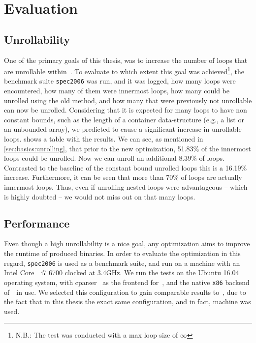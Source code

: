 \chapter{Evaluation}\label{sec:eval}

\section{Unrollability}\label{sec:eval:unrollability}

One of the primary goals of this thesis, was to increase the number of loops that are unrollable within~\libFIRM.
To evaluate to which extent this goal was achieved\footnote{N.B.: The test was conducted with a max loop size of $\infty$}, the benchmark suite \texttt{spec2006} was run, and it was logged, how many loops were encountered, how many of them were innermost loops, how many could be unrolled using the old method, and how many that were previously not unrollable can now be unrolled.
Considering that it is expected for many loops to have non constant bounds, such as the length of a container data-structure (e.g., a list or an unbounded array), we predicted to cause a significant increase in unrollable loops.
 shows a table with the results.
We can see, as mentioned in \cref{sec:basics:unrolling}, that prior to the new optimization, 51.83\% of the innermost loops could be unrolled.
Now we can unroll an additional 8.39\% of loops.
Contrasted to the baseline of the constant bound unrolled loops this is a 16.19\% increase.
Furthermore, it can be seen that more than 70\% of loops are actually innermost loops.
Thus, even if unrolling nested loops were advantageous -- which is highly doubted --  we would not miss out on that many loops.



\section{Performance}\label{sec:eval:perf}

Even though a high unrollability is a nice goal, any optimization aims to improve the runtime of produced binaries.
In order to evaluate the optimization in this regard, \texttt{spec2006} is used as a benchmark suite, and run on a machine with an Intel Core~\textregistered~i7 6700 clocked at 3.4GHz.
We run the tests on the Ubuntu 16.04 operating system, with cparser~\cite{cparser} as the frontend for~\libFIRM, and the native \texttt{x86} backend of~\libFIRM~in use.
We selected this configuration to gain comparable results to~\cite{aebi18bachelorarbeit}, due to the fact that in this thesis the exact same configuration, and in fact, machine was used.

